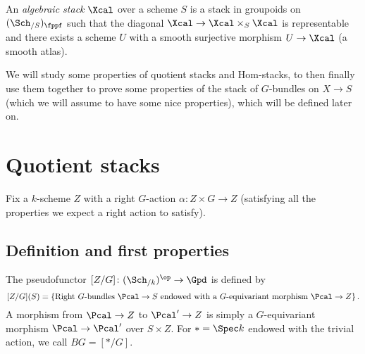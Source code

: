         \begin{defn}
            \label{defn:algebraic_stack}
            An \emph{algebraic stack} $\Xcal$ over a scheme $S$ is a stack in groupoids on $(\Sch_{/S})_{\fppf}$ such that the diagonal $\Xcal \to \Xcal \times_S \Xcal$ is representable and there exists a scheme $U$ with a smooth surjective morphism $U \to \Xcal$ (a smooth atlas).
        \end{defn}

        We will study some properties of quotient stacks and Hom-stacks, to then finally use them together to prove some properties of the stack of $G$-bundles on $X \to S$ (which we will assume to have some nice properties), which will be defined later on.

    \section{Quotient stacks}
        Fix a $k$-scheme $Z$ with a right $G$-action $\alpha\colon Z \times G \to Z$ (satisfying all the properties we expect a right action to satisfy).
        \subsection{Definition and first properties}
            \begin{defn}
                \label{defn:quotient_stack}
                The pseudofunctor $[Z/G]\colon (\Sch_{/k})^{\op} \to \Gpd$ is defined by 
                \[ [Z/G](S) = \left\{\text{Right $G$-bundles $\Pcal \to S$ endowed with a $G$-equivariant morphism $\Pcal \to Z$} \right\}.  \]
                A morphism from $\Pcal \to Z$ to $\Pcal' \to Z$ is simply a $G$-equivariant morphism $\Pcal \to \Pcal'$ over $S \times Z$.
                For $* = \Spec k$ endowed with the trivial action, we call $BG = [*/G]$.
            \end{defn}


